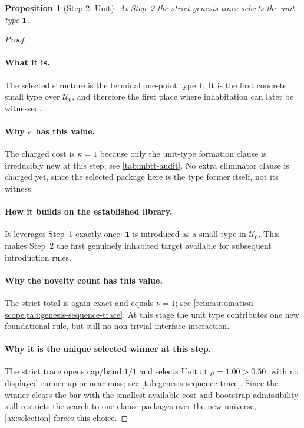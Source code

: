 \documentclass[11pt,a4paper]{article}
\theoremstyle{plain}
\newtheorem{proposition}[theorem]{Proposition}
\theoremstyle{definition}
\theoremstyle{remark}
\newcommand{\U}{\mathcal{U}}
\begin{document}
\begin{proposition}[Step 2: Unit]
\label{prop:genesis-step2}
At Step~2 the strict genesis trace selects the unit type $\mathbf{1}$.
\end{proposition}

\begin{proof}
\paragraph{What it is.}
The selected structure is the terminal one-point type $\mathbf{1}$.
It is the first concrete small type over $\U_0$, and therefore the first place
where inhabitation can later be witnessed.

\paragraph{Why $\kappa$ has this value.}
The charged cost is $\kappa=1$ because only the unit-type formation clause is
irreducibly new at this step; see \cref{tab:mbtt-audit}.
No extra eliminator clause is charged yet, since the selected package here is
the type former itself, not its witness.

\paragraph{How it builds on the established library.}
It leverages Step~1 exactly once: $\mathbf{1}$ is introduced as a small type in
$\U_0$.
This makes Step~2 the first genuinely inhabited target available for subsequent
introduction rules.

\paragraph{Why the novelty count has this value.}
The strict total is again exact and equals $\nu=1$; see
\cref{rem:automation-scope,tab:genesis-sequence-trace}.
At this stage the unit type contributes one new foundational rule, but still no
non-trivial interface interaction.

\paragraph{Why it is the unique selected winner at this step.}
The strict trace opens cap/band $1/1$ and selects Unit at
$\rho=1.00 > 0.50$, with no displayed runner-up or near miss; see
\cref{tab:genesis-sequence-trace}.
Since the winner clears the bar with the smallest available cost and bootstrap
admissibility still restricts the search to one-clause packages over the new
universe, \cref{ax:selection} forces this choice.
\end{proof}
\end{document}
